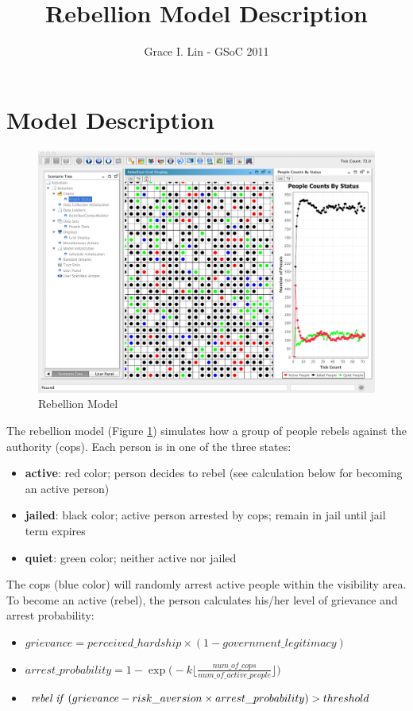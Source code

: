 \documentclass[11pt]{amsart}
\title{Rebellion Model Description}
\author{Grace I. Lin - GSoC 2011}
\begin{document}
 
\maketitle

\tableofcontents 

\section{Model Description}

\begin{figure}[h!]
\centering
\vspace{.2in}
\centerline {
\includegraphics[width=6in]{Images/rebellion.png}}
\caption{Rebellion Model}
\label{fig:rebellion}
\end{figure}

The rebellion model (Figure \ref{fig:rebellion}) simulates how a group of people rebels against the authority (cops).  Each person is in one of the three states:
\begin{itemize}
\item \textbf{active}: red color; person decides to rebel (see calculation below for becoming an active person)
\item \textbf{jailed}: black color; active person arrested by cops; remain in jail until jail term expires
\item \textbf{quiet}: green color; neither active nor jailed
\end{itemize}

The cops (blue color) will randomly arrest active people within the visibility area.  To become an active (rebel), the person calculates his/her level of grievance and arrest probability:
\begin{itemize}
\item[] $ grievance = perceived\_hardship \times (1 - government\_legitimacy) $
\item[] $ arrest\_probability = 1-\exp \bigg ( -k \bigg \lfloor \frac{num\_of\_cops}{num\_of\_active\_people} \bigg \rfloor \bigg) $
\item[] $ \text{\emph{rebel  if} } (grievance - risk\_aversion \times arrest\_probability) > threshold $
\end{itemize}
\end{document}
